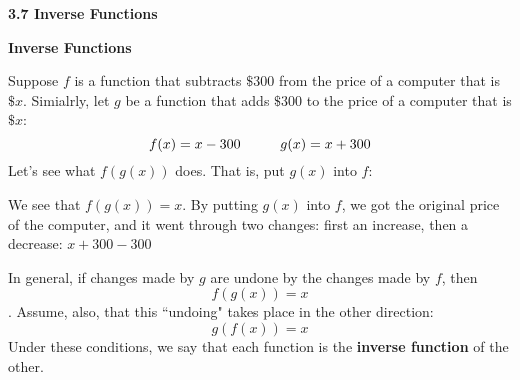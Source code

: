 \documentclass[12pt]{book}
\begin{document}
\begin{comment}
Name: \underline{\hspace{100mm}}
\vspace{20mm}
  \centerline{\Large \textbf{Chapter 2: Equations and Inequalities} } 

{\large
\begin{center}
\begin{varwidth}{\textwidth}
\begin{enumerate}[2.1]
    \item The Regular Coordinate System and Graphs
    \item Linear Equations in One Variable
    \item Models and  Applications (Skipping)
    \item Complex Numbers
    \item Quadratic Equations
    \item Other Types of Equations
    \item Linear Inequalities and Absolute Value Inequalities
\end{enumerate}
\end{varwidth}
\end{center}

}
\newpage  
\end{comment}

\textbf{{\Large 3.7 Inverse Functions}}
\vspace{3mm}



{ \large \textbf{Inverse Functions}}

Suppose $f$ is a function that subtracts $\$ 300$ from the price of a computer that is  $\$x$. Simialrly, let $g$ be a function that adds $\$300$ to the price of a computer that is $\$x$:
$$ f(x) = x - 300  \hspace{10mm} g(x) = x +300$$
Let's see what $f(g(x))$ does. That is, put $g(x)$ into $f$:



\vspace{35mm}

We see that $f(g(x))=x$. By putting $g(x)$ into $f$, we got the original price of the computer, and it went through two changes: first an increase, then a decrease: $x + 300 - 300$

In general, if changes made by $g$ are undone by the changes made by $f$, then $$f(g(x))=x$$.
Assume, also, that this ``undoing" takes place in the other direction: 
$$g(f(x)) = x$$
Under these conditions, we say that each function is the \textbf{inverse function} of the other.
\end{document}

